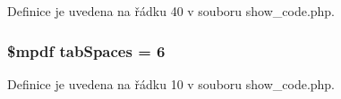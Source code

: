 Definice je uvedena na řádku 40 v souboru show\-\_\-code.\-php.

\hypertarget{show__code_8php_ab4e4c4f5a4a02d8b15368b16f6a0d60c}{
\subsubsection[{tab\-Spaces}]{\setlength{\rightskip}{0pt plus 5cm}\$mpdf tab\-Spaces = 6}}\label{show__code_8php_ab4e4c4f5a4a02d8b15368b16f6a0d60c}


Definice je uvedena na řádku 10 v souboru show\-\_\-code.\-php.

